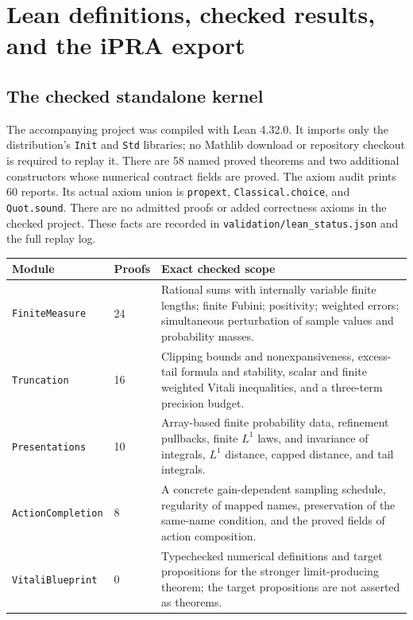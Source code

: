 \section{Lean definitions, checked results, and the iPRA export}\label{sec:formalization}

\subsection{The checked standalone kernel}

The accompanying project was compiled with Lean 4.32.0. It imports only
the distribution's \texttt{Init} and \texttt{Std} libraries; no Mathlib
download or repository checkout is required to replay it. There are
58 named proved theorems and two additional constructors whose numerical
contract fields are proved. The axiom audit prints 60 reports. Its actual
axiom union is \texttt{propext}, \texttt{Classical.choice}, and
\texttt{Quot.sound}. There are no admitted proofs or added correctness
axioms in the checked project. These facts are recorded in
\texttt{validation/lean\_status.json} and the full replay log.

\begin{longtable}{@{}p{}p{}p{}@{}}
\toprule
Module & Proofs & Exact checked scope\\
\midrule
\endhead
\texttt{FiniteMeasure} & 24 & Rational sums with internally variable finite lengths; finite Fubini; positivity; weighted errors; simultaneous perturbation of sample values and probability masses.\\
\texttt{Truncation} & 16 & Clipping bounds and nonexpansiveness, excess-tail formula and stability, scalar and finite weighted Vitali inequalities, and a three-term precision budget.\\
\texttt{Presentations} & 10 & Array-based finite probability data, refinement pullbacks, finite $L^1$ laws, and invariance of integrals, $L^1$ distance, capped distance, and tail integrals.\\
\texttt{ActionCompletion} & 8 & A concrete gain-dependent sampling schedule, regularity of mapped names, preservation of the same-name condition, and the proved fields of action composition.\\
\texttt{VitaliBlueprint} & 0 & Typechecked numerical definitions and target propositions for the stronger limit-producing theorem; the target propositions are not asserted as theorems.\\
\bottomrule
\end{longtable}


